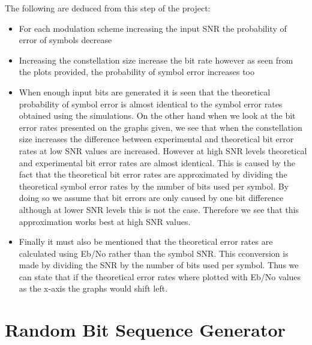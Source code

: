 \documentclass[]{article}
\begin{document}
The following are deduced from this step of the project:
\begin{itemize}
\item For each modulation scheme increasing the input SNR the probability of error of symbols decrease
\item Increasing the constellation size increase the bit rate however as seen from the plots provided, the probability of symbol error increases too
\item When enough input bits are generated it is seen that the theoretical probability of symbol error is almost identical to the symbol error rates obtained using the simulations. On the other hand when we look at the bit error rates presented on the graphs given, we see that when the constellation size increases the difference between experimental and theoretical bit error rates at low SNR values are increased. However at high SNR levels theoretical and experimental bit error rates are almost identical. This is caused by the fact that the theoretical bit error rates are approximated by dividing the theoretical symbol error rates by the number of bits used per symbol. By doing so we assume that bit errors are only caused by one bit difference although at lower SNR levels this is not the case. Therefore we see that this approximation works best at high SNR values. 
\item Finally it must also be mentioned that the theoretical error rates are calculated using Eb/No rather than the symbol SNR. This cconversion is made by dividing the SNR by the number of bits used per symbol. Thus we can state that if the theoretical error rates where plotted with Eb/No values as the x-axis the graphs would shift left.  

\end{itemize}

\appendix
\newpage
%


\section{Random Bit Sequence Generator}
\label{app:random_bit_generator}

\end{document}
